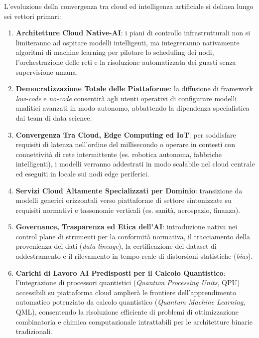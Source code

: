 \documentclass[11pt, a4paper]{article}
\begin{document}
L'evoluzione della convergenza tra cloud ed intelligenza artificiale si delinea lungo sei vettori primari:
\begin{enumerate}
    \item \textbf{Architetture Cloud Native-AI}: i piani di controllo infrastrutturali non si limiteranno ad ospitare modelli intelligenti, ma integreranno nativamente algoritmi di machine learning per pilotare lo scheduling dei nodi, l'orchestrazione delle reti e la risoluzione automatizzata dei guasti senza supervisione umana.
    \item \textbf{Democratizzazione Totale delle Piattaforme}: la diffusione di framework \emph{low-code} e \emph{no-code} consentirà agli utenti operativi di configurare modelli analitici avanzati in modo autonomo, abbattendo la dipendenza specialistica dai team di data science.
    \item \textbf{Convergenza Tra Cloud, Edge Computing ed IoT}: per soddisfare requisiti di latenza nell'ordine del millisecondo o operare in contesti con connettività di rete intermittente (es. robotica autonoma, fabbriche intelligenti), i modelli verranno addestrati in modo scalabile nel cloud centrale ed eseguiti in locale sui nodi edge periferici.
    \item \textbf{Servizi Cloud Altamente Specializzati per Dominio}: transizione da modelli generici orizzontali verso piattaforme di settore sintonizzate su requisiti normativi e tassonomie verticali (es. sanità, aerospazio, finanza).
    \item \textbf{Governance, Trasparenza ed Etica dell'AI}: introduzione nativa nei control plane di strumenti per la conformità normativa, il tracciamento della provenienza dei dati (\emph{data lineage}), la certificazione dei dataset di addestramento e il rilevamento in tempo reale di distorsioni statistiche (\emph{bias}).
    \item \textbf{Carichi di Lavoro AI Predisposti per il Calcolo Quantistico}: l'integrazione di processori quantistici (\emph{Quantum Processing Units}, QPU) accessibili su piattaforma cloud amplierà le frontiere dell'apprendimento automatico potenziato da calcolo quantistico (\emph{Quantum Machine Learning}, QML), consentendo la risoluzione efficiente di problemi di ottimizzazione combinatoria e chimica computazionale intrattabili per le architetture binarie tradizionali.
\end{enumerate}

\end{document}
